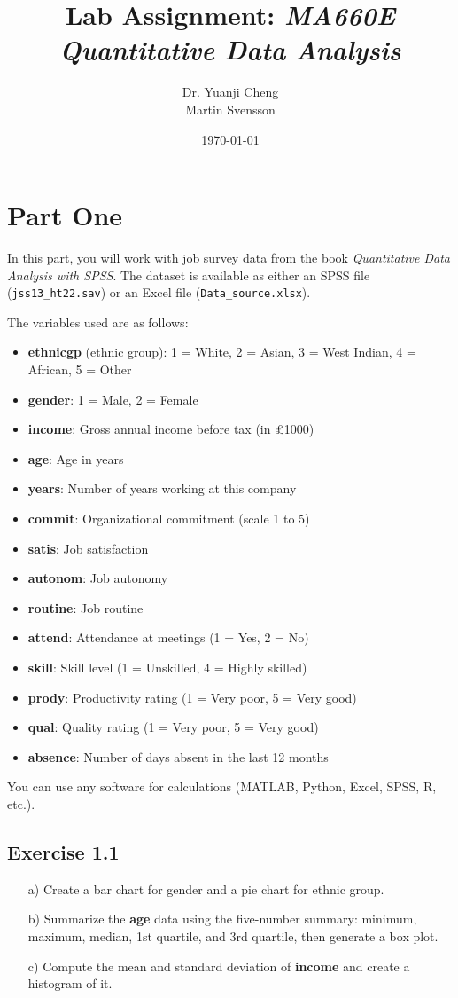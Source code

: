 \documentclass[a4paper,12pt]{article}
\title{Lab Assignment: \textit{MA660E Quantitative Data Analysis}}
\author{Dr. Yuanji Cheng \\ Martin Svensson}
\date{\today}
\begin{document}
\maketitle

\section*{Part One}
In this part, you will work with job survey data from the book \textit{Quantitative Data Analysis with SPSS}. The dataset is available as either an SPSS file (\texttt{jss13\_ht22.sav}) or an Excel file (\texttt{Data\_source.xlsx}).

The variables used are as follows:
\begin{itemize}
    \item \textbf{ethnicgp} (ethnic group): 1 = White, 2 = Asian, 3 = West Indian, 4 = African, 5 = Other
    \item \textbf{gender}: 1 = Male, 2 = Female
    \item \textbf{income}: Gross annual income before tax (in £1000)
    \item \textbf{age}: Age in years
    \item \textbf{years}: Number of years working at this company
    \item \textbf{commit}: Organizational commitment (scale 1 to 5)
    \item \textbf{satis}: Job satisfaction
    \item \textbf{autonom}: Job autonomy
    \item \textbf{routine}: Job routine
    \item \textbf{attend}: Attendance at meetings (1 = Yes, 2 = No)
    \item \textbf{skill}: Skill level (1 = Unskilled, 4 = Highly skilled)
    \item \textbf{prody}: Productivity rating (1 = Very poor, 5 = Very good)
    \item \textbf{qual}: Quality rating (1 = Very poor, 5 = Very good)
    \item \textbf{absence}: Number of days absent in the last 12 months
\end{itemize}

You can use any software for calculations (MATLAB, Python, Excel, SPSS, R, etc.).

\subsection*{Exercise 1.1}
\begin{enumerate}
    \item[a)] Create a bar chart for gender and a pie chart for ethnic group.
    \item[b)] Summarize the \textbf{age} data using the five-number summary: minimum, maximum, median, 1st quartile, and 3rd quartile, then generate a box plot.
    \item[c)] Compute the mean and standard deviation of \textbf{income} and create a histogram of it.
\end{enumerate}
\end{document}
